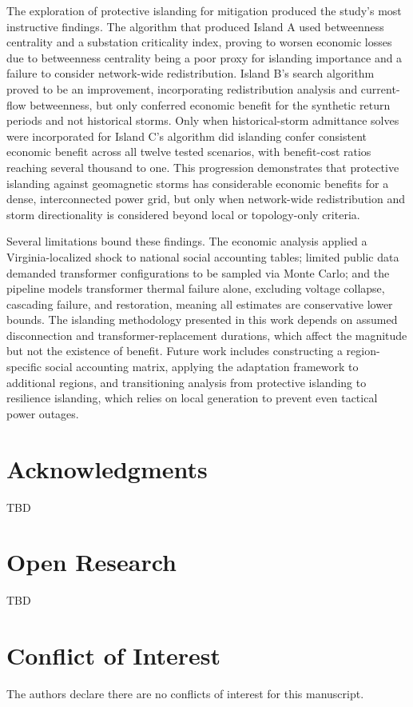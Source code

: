 \documentclass[draft]{agujournal2019}
\begin{document}
The exploration of protective islanding for mitigation produced the study's most instructive findings. The algorithm that produced Island A used betweenness centrality and a substation criticality index, proving to worsen economic losses due to betweenness centrality being a poor proxy for islanding importance and a failure to consider network-wide redistribution. Island B's search algorithm proved to be an improvement, incorporating redistribution analysis and current-flow betweenness, but only conferred economic benefit for the synthetic return periods and not historical storms. Only when historical-storm admittance solves were incorporated for Island C's algorithm did islanding confer consistent economic benefit across all twelve tested scenarios, with benefit-cost ratios reaching several thousand to one. This progression demonstrates that protective islanding against geomagnetic storms has considerable economic benefits for a dense, interconnected power grid, but only when network-wide redistribution and storm directionality is considered beyond local or topology-only criteria. 

Several limitations bound these findings. The economic analysis applied a Virginia-localized shock to national social accounting tables; limited public data demanded transformer configurations to be sampled via Monte Carlo; and the pipeline models transformer thermal failure alone, excluding voltage collapse, cascading failure, and restoration, meaning all estimates are conservative lower bounds. The islanding methodology presented in this work depends on assumed disconnection and transformer-replacement durations, which affect the magnitude but not the existence of benefit. Future work includes constructing a region-specific social accounting matrix, applying the adaptation framework to additional regions, and transitioning analysis from protective islanding to resilience islanding, which relies on local generation to prevent even tactical power outages.

\section*{Acknowledgments}\label{acknowledgements}
TBD

\section*{Open Research}\label{open-research}

TBD

\section*{Conflict of Interest}
The authors declare there are no conflicts of interest for this manuscript.

\newpage

\end{document}
